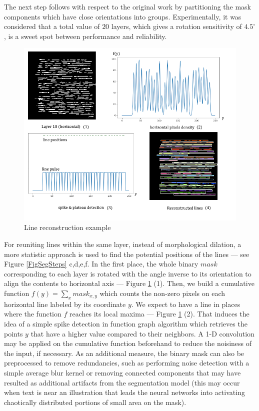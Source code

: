 The next step follows with respect to the original work \cite{segmChallenging} by partitioning the mask components which have close orientations into groups. Experimentally, it was considered that a total value of $20$ layers, which gives a rotation sensitivity of $4.5^\circ$, is a sweet spot between performance and reliability. 

\begin{figure}[htbp]
    \centering
        \includegraphics[scale=0.7]{figures/line_reconstruction.png}
    \caption{Line reconstruction example}    
    \label{FigLineRecon}        
\end{figure}

For reuniting lines within the same layer, instead of morphological dilation, a more statistic approach is used to find the potential positions of the lines --- see Figure \ref{FigSegSteps} c,d,e,f. In the first place, the whole binary $mask$ corresponding to each layer is rotated with the angle inverse to its orientation to align the contents to horizontal axis --- Figure \ref{FigLineRecon} (1). Then, we build a cumulative function $f(y)=\sum_{x} mask_{x,y}$
which counts the non-zero pixels on each horizontal line labeled by its coordinate $y$. We expect to have a line in places where the function $f$ reaches its local maxima --- Figure \ref{FigLineRecon} (2). That induces the idea of a simple spike detection in function graph algorithm which retrieves the points $y$ that have a higher value compared to their neighbors. A 1-D convolution may be applied on the cumulative function beforehand to reduce the noisiness of the input, if necessary. As an additional measure, the binary mask can also be preprocessed to remove redundancies, such as performing noise detection with a simple average blur kernel or removing connected components that may have resulted as additional artifacts from the segmentation model (this may occur when text is near an illustration that leads the neural networks into activating chaotically distributed portions of small area on the mask).


